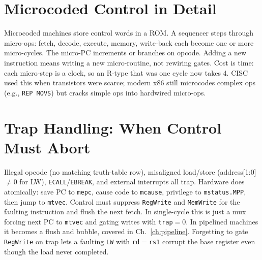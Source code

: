 \section{Microcoded Control in Detail}
Microcoded machines store control words in a ROM. A sequencer steps through micro-ops: fetch, decode, execute, memory, write-back each become one or more micro-cycles. The micro-PC increments or branches on opcode. Adding a new instruction means writing a new micro-routine, not rewiring gates. Cost is time: each micro-step is a clock, so an R-type that was one cycle now takes 4. CISC used this when transistors were scarce; modern x86 still microcodes complex ops (e.g., \texttt{REP MOVS}) but cracks simple ops into hardwired micro-ops.

\begin{center}
\end{center}

\section{Trap Handling: When Control Must Abort}
Illegal opcode (no matching truth-table row), misaligned load/store (address[1:0]$\neq$0 for LW), \texttt{ECALL}/\texttt{EBREAK}, and external interrupts all trap. Hardware does atomically: save PC to \texttt{mepc}, cause code to \texttt{mcause}, privilege to \texttt{mstatus.MPP}, then jump to \texttt{mtvec}. Control must suppress \texttt{RegWrite} and \texttt{MemWrite} for the faulting instruction and flush the next fetch. In single-cycle this is just a mux forcing next PC to \texttt{mtvec} and gating writes with \texttt{trap}$=0$. In pipelined machines it becomes a flush and bubble, covered in Ch.~\ref{ch:pipeline}. Forgetting to gate \texttt{RegWrite} on trap lets a faulting \texttt{LW} with \texttt{rd}$=$\texttt{rs1} corrupt the base register even though the load never completed.


